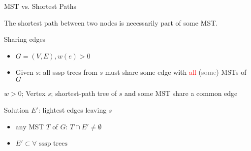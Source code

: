 
\begin{frame}{}
  \begin{exampleblock}{MST vs. Shortest Paths }
    \centerline{\xmark The shortest path between two nodes is necessarily part of some MST.}
  \end{exampleblock}

\end{frame}

\begin{frame}{}
  \begin{exampleblock}{Sharing edges }
    \begin{itemize}
      \item $G = (V, E), w(e) > 0$
      \item Given $s$: all sssp trees from $s$ must share some edge with \textcolor{red}{all} (\textcolor{gray}{some}) MSTs of $G$
    \end{itemize}
      \cmark $w > 0$; Vertex $s$; shortest-path tree of $s$ and some MST share a common edge 
  \end{exampleblock}

  \begin{block}{Solution}
    $E'$: lightest edges leaving $s$
    \begin{itemize}
      \item any MST $T$ of $G$: $T \cap E' \neq \emptyset$
      \item $E' \subset \forall \text{ sssp trees}$
    \end{itemize}
  \end{block}
\end{frame}
